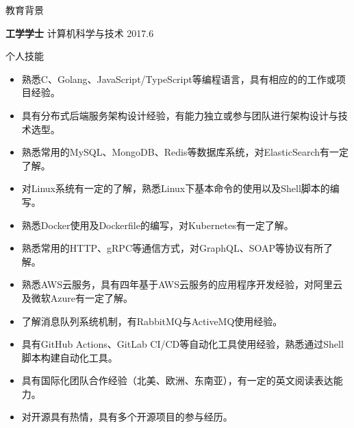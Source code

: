 \documentclass{resume} %
\begin{document}

\begin{rSection}{教育背景}

  {\bf 工学学士} 计算机科学与技术 \hfill {2017.6}

\end{rSection}

\begin{rSection}{个人技能}
  \begin{itemize}
    \itemsep -3pt {}
    \item 熟悉C、Golang、JavaScript/TypeScript等编程语言，具有相应的的工作或项目经验。
    \item 具有分布式后端服务架构设计经验，有能力独立或参与团队进行架构设计与技术选型。
    \item 熟悉常用的MySQL、MongoDB、Redis等数据库系统，对ElasticSearch有一定了解。
    \item 对Linux系统有一定的了解，熟悉Linux下基本命令的使用以及Shell脚本的编写。
    \item 熟悉Docker使用及Dockerfile的编写，对Kubernetes有一定了解。
    \item 熟悉常用的HTTP、gRPC等通信方式，对GraphQL、SOAP等协议有所了解。
    \item 熟悉AWS云服务，具有四年基于AWS云服务的应用程序开发经验，对阿里云及微软Azure有一定了解。
    \item 了解消息队列系统机制，有RabbitMQ与ActiveMQ使用经验。
    \item 具有GitHub Actions、GitLab CI/CD等自动化工具使用经验，熟悉通过Shell脚本构建自动化工具。
    \item 具有国际化团队合作经验（北美、欧洲、东南亚），有一定的英文阅读表达能力。
    \item 对开源具有热情，具有多个开源项目的参与经历。
  \end{itemize}
\end{rSection}
\end{document}
